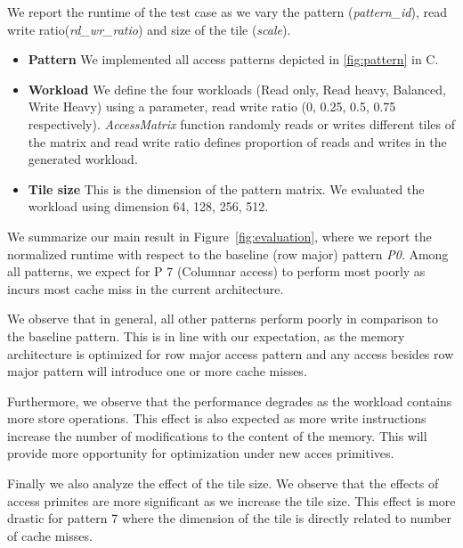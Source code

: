 \documentclass[letterpaper]{article}
\begin{document}
We report the runtime of the test case as we vary the pattern
(\textit{pattern\_id}), read write ratio(\textit{rd\_wr\_ratio}) and size of the tile (\textit{scale}).

\begin{itemize}
  \item \textbf{Pattern} We implemented all access patterns depicted in \ref{fig:pattern} in C.
  \item \textbf{Workload} We define the four workloads (Read only, Read heavy,
Balanced, Write Heavy) using a parameter, read write ratio (0, 0.25, 0.5, 0.75 respectively).
\textit{AccessMatrix} function randomly reads or writes different tiles of the matrix and read
write ratio defines proportion of reads and writes in the generated workload.
  \item \textbf{Tile size} This is the dimension of the pattern matrix. We evaluated the
  workload using dimension 64, 128, 256, 512.
\end{itemize}

We summarize our main result in Figure~\ref{fig:evaluation}, where we report the normalized runtime
with respect to the baseline (row major) pattern \textit{P0}. Among all patterns, we expect for P 7 (Columnar access) to perform most poorly as incurs most cache miss in the current architecture. 

 We observe that in general, all other patterns
perform poorly in comparison to the baseline pattern. This is in line with our expectation, 
as the memory architecture is optimized for row major access pattern and any access besides row major pattern will introduce one or more cache misses. 

Furthermore, we observe that the performance degrades as the workload contains more store operations. 
This effect is also expected as more write instructions 
increase the number of modifications to the content of the 
memory. This will provide more opportunity for optimization under new acces primitives. 

Finally we also analyze the effect of the tile size. We observe that the effects of access primites are more
significant as we increase the tile size. This effect is more drastic for pattern 7 where the dimension of the
tile is directly related to number of cache misses. 
\end{document}
